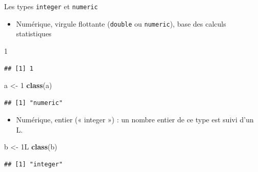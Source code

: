 \documentclass[
  ignorenonframetext,
]{beamer}
\newenvironment{Shaded}{\begin{snugshade}}{\end{snugshade}}
\newcommand{\DataTypeTok}[1]{\textcolor[rgb]{0.13,0.29,0.53}{#1}}
\newcommand{\DecValTok}[1]{\textcolor[rgb]{0.00,0.00,0.81}{#1}}
\newcommand{\FunctionTok}[1]{\textcolor[rgb]{0.13,0.29,0.53}{\textbf{#1}}}
\newcommand{\NormalTok}[1]{#1}
\newcommand{\OtherTok}[1]{\textcolor[rgb]{0.56,0.35,0.01}{#1}}
\providecommand{\tightlist}{%
  \setlength{\itemsep}{0pt}\setlength{\parskip}{0pt}}
\begin{document}
\begin{frame}[fragile]{Les types \texttt{integer} et \texttt{numeric}}
\protect\hypertarget{les-types-integer-et-numeric}{}
\begin{itemize}
\tightlist
\item
  Numérique, virgule flottante (\texttt{double} ou \texttt{numeric}),
  base des calculs statistiques
\end{itemize}

\tiny

\begin{Shaded}
\begin{Highlighting}[]
\DecValTok{1}
\end{Highlighting}
\end{Shaded}

\begin{verbatim}
## [1] 1
\end{verbatim}

\normalsize

\tiny

\begin{Shaded}
\begin{Highlighting}[]
\NormalTok{a }\OtherTok{\textless{}{-}} \DecValTok{1} 
\FunctionTok{class}\NormalTok{(a)}
\end{Highlighting}
\end{Shaded}

\begin{verbatim}
## [1] "numeric"
\end{verbatim}

\normalsize

\begin{itemize}
\tightlist
\item
  Numérique, entier (« integer ») : un nombre entier de ce type est
  suivi d'un L.
\end{itemize}

\tiny

\begin{Shaded}
\begin{Highlighting}[]
\NormalTok{b }\OtherTok{\textless{}{-}} \DecValTok{1}\DataTypeTok{L}
\FunctionTok{class}\NormalTok{(b)}
\end{Highlighting}
\end{Shaded}

\begin{verbatim}
## [1] "integer"
\end{verbatim}

\normalsize
\end{frame}
\end{document}
